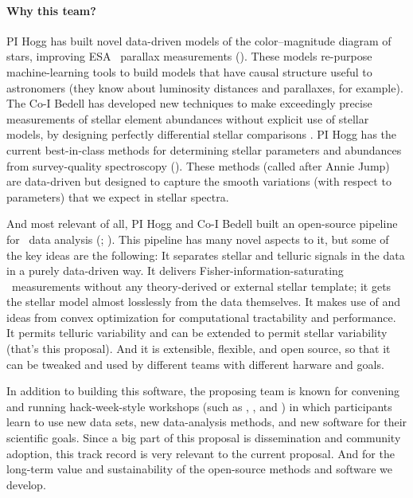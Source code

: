 \documentclass[12pt, letterpaper]{article}
\begin{document}
\paragraph{Why this team?}
PI Hogg has built novel data-driven models of the color--magnitude diagram of
stars, improving ESA \Gaia\ parallax measurements (\citealt{Leistedt, Widmark, Anderson}).
These models re-purpose machine-learning tools to build models that
have causal structure useful to astronomers (they know about
luminosity distances and parallaxes, for example).
The Co-I Bedell has developed new techniques to make exceedingly
precise measurements of stellar element abundances without explicit
use of stellar models, by designing perfectly differential stellar
comparisons \citep{Bedell2014, Bedell2018}.
PI Hogg has the current best-in-class methods for determining stellar
parameters and abundances from survey-quality spectroscopy (\citealt{Cannon2, Doppel}).
These methods (called  after Annie Jump) are
data-driven but designed to capture the smooth variations (with
respect to parameters) that we expect in stellar spectra.

And most relevant of all, PI Hogg and Co-I Bedell built an open-source
pipeline for \EPRV\ data analysis (\wobble; \citealt{Bedell2019}).
This pipeline has many novel aspects to it, but some of the key ideas
are the following: 
It separates stellar and telluric signals in the data in a purely
data-driven way.
It delivers Fisher-information-saturating \RV\ measurements without any
theory-derived or external stellar template; it gets the stellar model
almost losslessly from the data themselves.
It makes use of  and ideas from convex optimization
for computational tractability and performance.
It permits telluric variability and can be extended to permit stellar
variability (that's this proposal).
And it is extensible, flexible, and open source, so that it can be
tweaked and used by different teams with different harware and goals.

In addition to building this software, the proposing team is known for
convening and running hack-week-style workshops (such as , , and ) in which participants learn to use new data sets, new
data-analysis methods, and new software for their scientific goals.
Since a big part of this proposal is dissemination and community adoption,
this track record is very relevant to the current proposal.
And for the long-term value and sustainability of the open-source methods
and software we develop.
\end{document}

